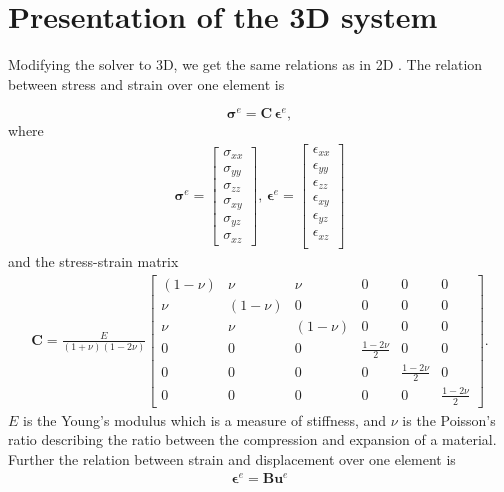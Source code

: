 \section{Presentation of the 3D system}
Modifying the solver to 3D, we get the same relations as in 2D  \cite{note2}. The relation between stress and strain over one element is

\begin{equation}
\label{stress-strain}
\bm{\sigma}^e = \bm{C} \, \bm{\epsilon}^e,
\end{equation}
where
\begin{align*}
\bm{\sigma}^e =
\begin{bmatrix}
\sigma_{xx} \\
\sigma_{yy} \\
\sigma_{zz} \\
\sigma_{xy} \\
\sigma_{yz} \\
\sigma_{xz}
\end{bmatrix}, \,
\bm{\epsilon}^e = 
\begin{bmatrix}
\epsilon_{xx} \\
\epsilon_{yy} \\
\epsilon_{zz} \\
\epsilon_{xy} \\
\epsilon_{yz} \\
\epsilon_{xz} \\
\end{bmatrix}
\end{align*}
and the stress-strain matrix \cite{stressMatrix}
\begin{align*}
\bm{C} = \frac{E}{(1+\nu)(1-2\nu)}
\begin{bmatrix}
(1-\nu) & \nu & \nu & 0 & 0 & 0 \\
\nu & (1-\nu) & 0 & 0 & 0 & 0 \\
\nu & \nu & (1-\nu) & 0 & 0 & 0 \\
0 & 0 & 0 & \frac{1-2\nu}{2} & 0 & 0 \\
0 & 0 & 0 & 0 & \frac{1-2\nu}{2} & 0 \\
0 & 0 & 0 & 0 & 0 & \frac{1-2\nu}{2}
\end{bmatrix}.
\end{align*}
$E$ is the Young's modulus which is a measure of stiffness, and $\nu$ is the Poisson's ratio describing the ratio between the compression and expansion of a material. Further the relation between strain and displacement over one element is
\begin{align}
\label{strain-displacement}
\bm{\epsilon}^e = \bm{B} \bm{u}^e
\end{align}
